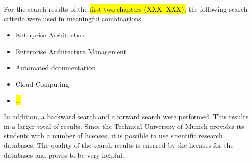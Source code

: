 For the search results of the \hl{ first two chapters (XXX, XXX),} the following search criteria were used in meaningful combinations:

\begin{itemize}
    \item Enterprise Architecture
    \item Enterprise Architecture Management
    \item Automated documentation
    \item Cloud Computing
    \item \hl{...}
    
\end{itemize}

In addition, a backward search and a forward search were performed. This results in a larger total of results. Since the Technical University of Munich provides its students with a number of licenses, it is possible to use scientific research databases. The quality of the search results is ensured by the licenses for the databases and proves to be very helpful.